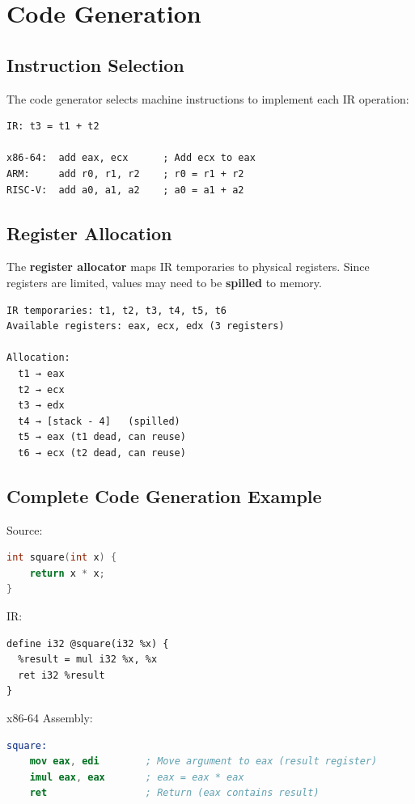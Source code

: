 \section{Code Generation}

\subsection{Instruction Selection}

The code generator selects machine instructions to implement each IR operation:

\begin{verbatim}
IR: t3 = t1 + t2

x86-64:  add eax, ecx      ; Add ecx to eax
ARM:     add r0, r1, r2    ; r0 = r1 + r2
RISC-V:  add a0, a1, a2    ; a0 = a1 + a2
\end{verbatim}

\subsection{Register Allocation}

The \textbf{register allocator} maps IR temporaries to physical registers. Since registers are limited, values may need to be \textbf{spilled} to memory.

\begin{verbatim}
IR temporaries: t1, t2, t3, t4, t5, t6
Available registers: eax, ecx, edx (3 registers)

Allocation:
  t1 → eax
  t2 → ecx
  t3 → edx
  t4 → [stack - 4]   (spilled)
  t5 → eax (t1 dead, can reuse)
  t6 → ecx (t2 dead, can reuse)
\end{verbatim}

\subsection{Complete Code Generation Example}

Source:
\begin{lstlisting}[language=C]
int square(int x) {
    return x * x;
}
\end{lstlisting}

IR:
\begin{verbatim}
define i32 @square(i32 %x) {
  %result = mul i32 %x, %x
  ret i32 %result
}
\end{verbatim}

x86-64 Assembly:
\begin{lstlisting}[language=nasm]
square:
    mov eax, edi        ; Move argument to eax (result register)
    imul eax, eax       ; eax = eax * eax
    ret                 ; Return (eax contains result)
\end{lstlisting}

